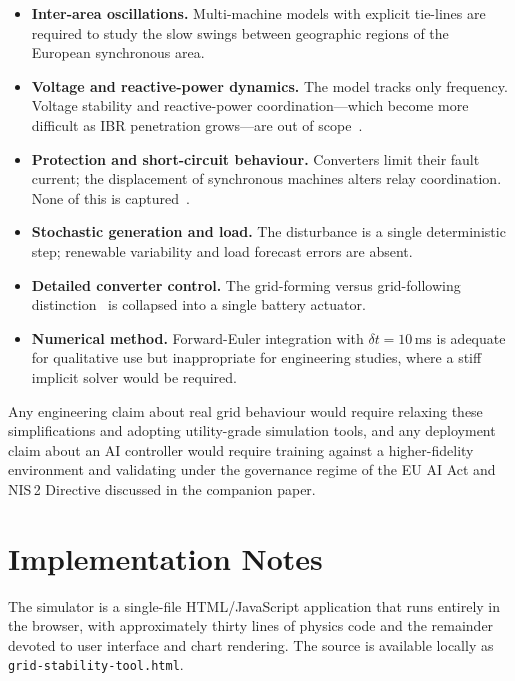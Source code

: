\documentclass[conference]{IEEEtran}
\begin{document}
\begin{itemize}
\item \textbf{Inter-area oscillations.} Multi-machine models with explicit tie-lines are required to study the slow swings between geographic regions of the European synchronous area.
\item \textbf{Voltage and reactive-power dynamics.} The model tracks only frequency. Voltage stability and reactive-power coordination---which become more difficult as IBR penetration grows---are out of scope~\cite{hatziargyriou2021revisited}.
\item \textbf{Protection and short-circuit behaviour.} Converters limit their fault current; the displacement of synchronous machines alters relay coordination. None of this is captured~\cite{entsoe2017hpopeips}.
\item \textbf{Stochastic generation and load.} The disturbance is a single deterministic step; renewable variability and load forecast errors are absent.
\item \textbf{Detailed converter control.} The grid-forming versus grid-following distinction~\cite{lasseter2020gridforming} is collapsed into a single battery actuator.
\item \textbf{Numerical method.} Forward-Euler integration with $\delta t = 10$\,ms is adequate for qualitative use but inappropriate for engineering studies, where a stiff implicit solver would be required.
\end{itemize}
Any engineering claim about real grid behaviour would require relaxing these simplifications and adopting utility-grade simulation tools, and any deployment claim about an AI controller would require training against a higher-fidelity environment and validating under the governance regime of the EU AI Act and NIS\,2 Directive discussed in the companion paper.

\section{Implementation Notes}
The simulator is a single-file HTML/JavaScript application that runs entirely in the browser, with approximately thirty lines of physics code and the remainder devoted to user interface and chart rendering. The source is available locally as \texttt{grid-stability-tool.html}.



\end{document}
